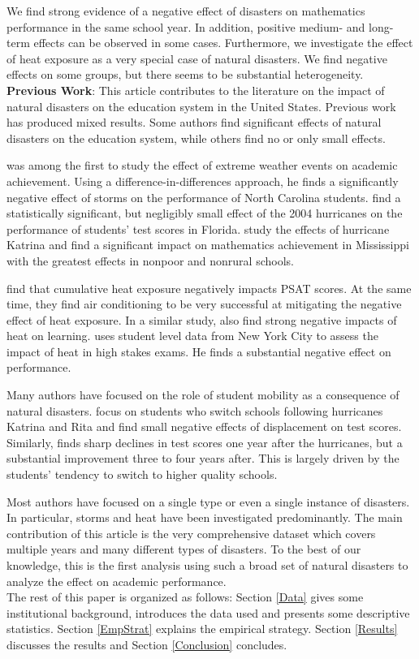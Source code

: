 We find strong evidence of a negative effect of disasters on mathematics performance in the same school year. In addition, positive medium- and long-term effects can be observed in some cases. Furthermore, we investigate the effect of heat exposure as a very special case of natural disasters. We find negative effects on some groups, but there seems to be substantial heterogeneity.
\\

\textbf{Previous Work}: This article contributes to the literature on the impact of natural disasters on the education system in the United States. Previous work has produced mixed results. Some authors find significant effects of natural disasters on the education system, while others find no or only small effects.

\cite{Holmes_2002} was among the first to study the effect of extreme weather events on academic achievement. Using a difference-in-differences approach, he finds a significantly negative effect of storms on the performance of North Carolina students. \cite{Baggerly_2008} find a statistically significant, but negligibly small effect of the 2004 hurricanes on the performance of students' test scores in Florida. \cite{Lamb_2013} study the effects of hurricane Katrina and find a significant impact on mathematics achievement in Mississippi with the greatest effects in nonpoor and nonrural schools.

\cite{Goodman_2020} find that cumulative heat exposure negatively impacts PSAT scores. At the same time, they find air conditioning to be very successful at mitigating the negative effect of heat exposure. In a similar study, \cite{Park_2020} also find strong negative impacts of heat on learning. \cite{Park_2022} uses student level data from New York City to assess the impact of heat in high stakes exams. He finds a substantial negative effect on performance.

Many authors have focused on the role of student mobility as a consequence of natural disasters. \cite{Pane_2008} focus on students who switch schools following hurricanes Katrina and Rita and find small negative effects of displacement on test scores. Similarly, \cite{Sacerdote_2012} finds sharp declines in test scores one year after the hurricanes, but a substantial improvement three to four years after. This is largely driven by the students' tendency to switch to higher quality schools.

Most authors have focused on a single type or even a single instance of disasters. In particular, storms and heat have been investigated predominantly. The main contribution of this article is the very comprehensive dataset which covers multiple years and many different types of disasters. To the best of our knowledge, this is the first analysis using such a broad set of natural disasters to analyze the effect on academic performance.
\\

The rest of this paper is organized as follows: Section \ref{Data} gives some institutional background, introduces the data used and presents some descriptive statistics. Section \ref{EmpStrat} explains the empirical strategy. Section \ref{Results} discusses the results and Section \ref{Conclusion} concludes.


